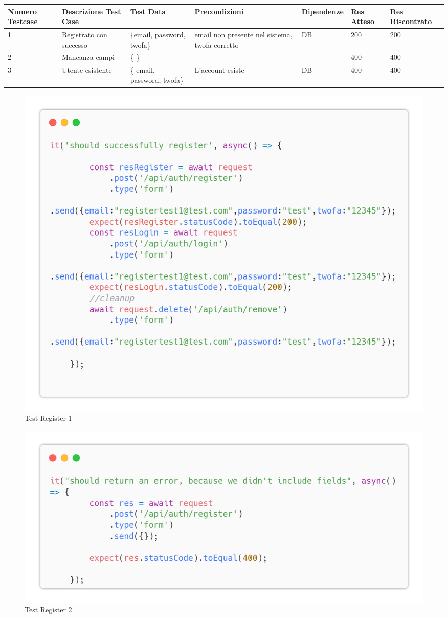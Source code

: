 \documentclass{report}
\begin{document}
\begin{center} %
	\centering
	\begin{tabular}{ |p{1cm}|p{2cm}|p{2cm}|p{2cm}|p{2cm}|p{1cm}|p{1cm}| }
		\hline
		Numero Testcase & Descrizione Test Case   & Test Data                   & Precondizioni                                  & Dipendenze & Res Atteso & Res Riscontrato \\
		\hline
		1               & Registrato con successo & \{email, password, twofa\}  & email non presente nel sistema, twofa corretto & DB         & 200        & 200             \\
		\hline
		2               & Mancanza campi          & \{ \}                       &                                                &            & 400        & 400             \\
		\hline
		3               & Utente  esistente       & \{ email, password, twofa\} & L'account esiste                               & DB         & 400        & 400             \\
		\hline
	\end{tabular}
\end{center}
\begin{figure}[H]
	\centering\includegraphics[width=1\textwidth]{images/microservizio-autenticazione/tests/register_test_1.png}
	\caption{Test Register 1}
\end{figure}
\begin{figure}[H]
	\centering\includegraphics[width=1\textwidth]{images/microservizio-autenticazione/tests/register_test_2.png}
	\caption{Test Register 2}
\end{figure}
\end{document}
